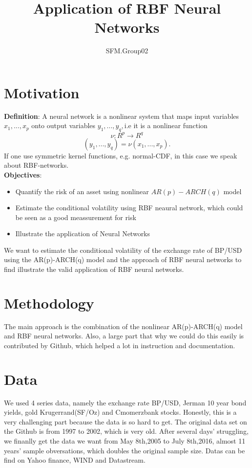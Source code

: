 \documentclass{article}
\author{SFM.Group02}
\title{Application of RBF Neural Networks}
\begin{document}
\begin{spacing}{2.0}
\maketitle
	\tableofcontents
	\newpage
\section{Motivation}
\textbf{Definition}:
A neural network is a nonlinear system that maps input variables $x_{1},...,x_{p}$ onto output variables $y_{1},...,y_{q},$i.e it is a nonlinear function
$$\nu:R^{p}\longrightarrow R^{q}$$
$$(y_{1},...,y_{q})=\nu(x_{1},...,x_{p}).$$
If one use symmetric kernel functions, e.g. normal-CDF, in this case we speak about RBF-networks.\\
\textbf{Objectives}:
\begin{itemize}
	\item Quantify the risk of an asset using nonlinear $AR(p)-ARCH(q)$ model
	\item Estimate the conditional volatility using RBF neaural network, which could be seen as a good meassurement for risk
	\item Illustrate the application of Neural Networks
\end{itemize}
We want to estimate the conditional volatility of the exchange rate of BP/USD using the AR(p)-ARCH(q) model and the approach of RBF neural networks to find illustrate the valid application of RBF neural networks.
\section{Methodology}
The main approach is the combination of the nonlinear AR(p)-ARCH(q) model and RBF neural networks. Also, a large part that why we could do this easily is contributed by Github, which helped a lot in instruction and documentation.
\section{Data}
We used 4 series data, namely the exchange rate BP/USD, Jerman 10 year bond yields, gold Krugerrand(SF/Oz) and Cmomerzbank stocks. Honestly, this is a very challenging part because the data is so hard to get. The original data set on the Github is from 1997 to 2002, which is very old. After several days' struggling, we finanlly get the data we want from May 8th,2005 to July 8th,2016, almost 11 years' sample obversations, which doubles the original sample size.  Datas can be find on Yahoo finance, WIND and Datastream.

\end{spacing}
\end{document}
